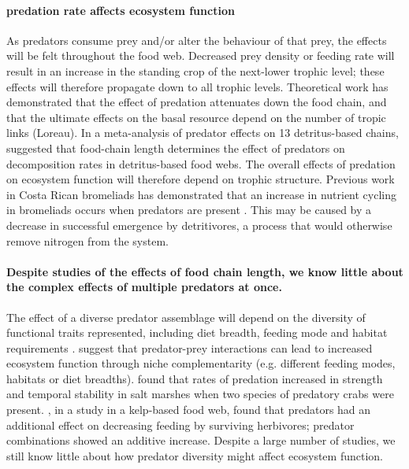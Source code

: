 \documentclass[10pt]{article}
\begin{document}
\begin{spacing}{2}
\paragraph{predation rate affects ecosystem function} As predators
consume prey and/or alter the behaviour of that prey, the effects will
be felt throughout the food web.  Decreased prey density or feeding
rate will result in an increase in the standing crop of the next-lower
trophic level; these effects will therefore propagate down to all
trophic levels.  Theoretical work has demonstrated that the effect of
predation attenuates down the food chain, and that the ultimate
effects on the basal resource depend on the number of tropic links
(Loreau). In a meta-analysis of predator effects on 13 detritus-based
chains, \citet{Schmitz2007} suggested that food-chain length
determines the effect of predators on decomposition rates in
detritus-based food webs. The overall effects of predation on ecosystem
function will therefore depend on trophic structure. Previous work in
Costa Rican bromeliads has demonstrated that an increase in nutrient
cycling in bromeliads occurs when predators are present
\citep{Ngai2006}.  This may be caused by a decrease in successful
emergence by detritivores, a process that would otherwise remove
nitrogen from the system.

\paragraph{Despite studies of the effects of food chain length, we know little
about the complex effects of multiple predators at once.}%
The effect of a diverse predator assemblage will depend on the
diversity of functional traits represented, including diet breadth,
feeding mode and habitat requirements
\citep{Schmitz2009}. \citet{Ives2005} suggest that predator-prey
interactions can lead to increased ecosystem function through niche
complementarity (e.g. different feeding modes, habitats or diet
breadths). \citet{Griffin2011} found that rates of predation increased
in strength and temporal stability in salt marshes when two species of
predatory crabs were present. \citet{Byrnes2006}, in a study in a
kelp-based food web, found that predators had an additional effect on
decreasing feeding by surviving herbivores; predator combinations
showed an additive increase.  Despite a large number of studies, we
still know little about how predator diversity might affect ecosystem
function.


\end{spacing}
\end{document}

